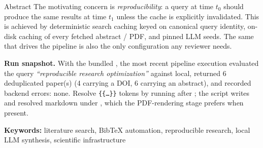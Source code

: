 \documentclass[
  ignorenonframetext,
]{beamer}
\begin{document}
\begin{frame}{Abstract}
The motivating concern is \emph{reproducibility}: a query at time
\(t_0\) should produce the same results at time \(t_1\) unless the cache
is explicitly invalidated. This is achieved by deterministic search
caching keyed on canonical query identity, on-disk caching of every
fetched abstract / PDF, and pinned LLM seeds. The same
 that drives the pipeline is also the
only configuration any reviewer needs.

\textbf{Run snapshot.} With the bundled ,
the most recent pipeline execution evaluated the query
\emph{``reproducible research optimization''} against local, returned 6
deduplicated paper(s) (4 carrying a DOI, 6 carrying an abstract), and
recorded backend errors: none. Resolve \texttt{\{\{…\}\}} tokens by
running  after
; the script writes
 and resolved markdown
under , which the PDF-rendering stage prefers
when present.

\textbf{Keywords:} literature search, BibTeX automation, reproducible
research, local LLM synthesis, scientific infrastructure
\end{frame}
\end{document}

